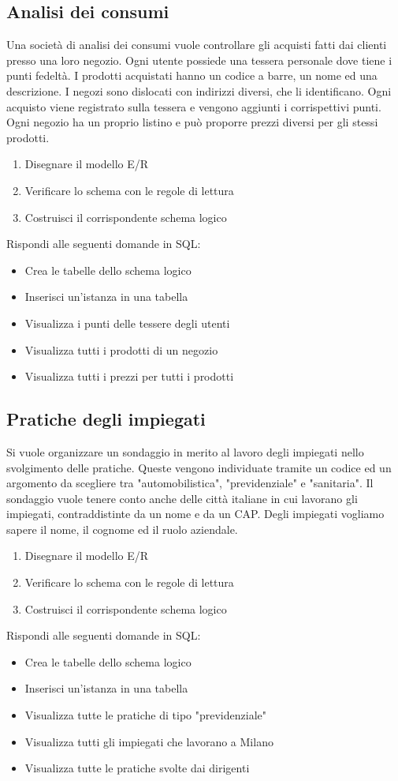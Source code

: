 \documentclass{article}
\begin{document}
	\subsection{Analisi dei consumi}
	Una società di analisi dei consumi vuole controllare gli acquisti fatti dai clienti presso una loro negozio. Ogni utente possiede una tessera personale dove tiene i punti fedeltà. I prodotti acquistati hanno un codice a barre, un nome ed una descrizione. I negozi sono dislocati con indirizzi diversi, che li identificano. Ogni acquisto viene registrato sulla tessera e vengono aggiunti i corrispettivi punti. Ogni negozio ha un proprio listino e può proporre prezzi diversi per gli stessi prodotti.
	\begin{enumerate}
		\item Disegnare il modello E/R
		\item Verificare lo schema con le regole di lettura
		\item Costruisci il corrispondente schema logico
	\end{enumerate}
	Rispondi alle seguenti domande in SQL:
	\begin{itemize}
		\item Crea le tabelle dello schema logico
		\item Inserisci un'istanza in una tabella
		\item Visualizza i punti delle tessere degli utenti
		\item Visualizza tutti i prodotti di un negozio
		\item Visualizza tutti i prezzi per tutti i prodotti
	\end{itemize}
	
	\subsection{Pratiche degli impiegati}
	Si vuole organizzare un sondaggio in merito al lavoro degli impiegati nello svolgimento delle pratiche. Queste vengono individuate tramite un codice ed un argomento da scegliere tra "automobilistica", "previdenziale" e "sanitaria". Il sondaggio vuole tenere conto anche delle città italiane in cui lavorano gli impiegati, contraddistinte da un nome e da un CAP. Degli impiegati vogliamo sapere il nome, il cognome ed il ruolo aziendale.
	\begin{enumerate}
		\item Disegnare il modello E/R
		\item Verificare lo schema con le regole di lettura
		\item Costruisci il corrispondente schema logico
	\end{enumerate}
	Rispondi alle seguenti domande in SQL:
	\begin{itemize}
		\item Crea le tabelle dello schema logico
		\item Inserisci un'istanza in una tabella
		\item Visualizza tutte le pratiche di tipo "previdenziale"
		\item Visualizza tutti gli impiegati che lavorano a Milano
		\item Visualizza tutte le pratiche svolte dai dirigenti
	\end{itemize}
\end{document}
